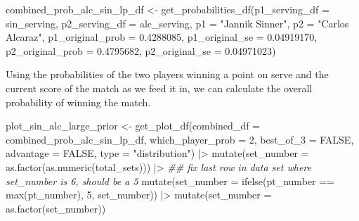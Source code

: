 \documentclass[
  letterpaper,
  DIV=11,
  numbers=noendperiod]{scrartcl}
\newenvironment{Shaded}{\begin{snugshade}}{\end{snugshade}}
\newcommand{\AttributeTok}[1]{\textcolor[rgb]{0.40,0.45,0.13}{#1}}
\newcommand{\ConstantTok}[1]{\textcolor[rgb]{0.56,0.35,0.01}{#1}}
\newcommand{\DecValTok}[1]{\textcolor[rgb]{0.68,0.00,0.00}{#1}}
\newcommand{\DocumentationTok}[1]{\textcolor[rgb]{0.37,0.37,0.37}{\textit{#1}}}
\newcommand{\FloatTok}[1]{\textcolor[rgb]{0.68,0.00,0.00}{#1}}
\newcommand{\FunctionTok}[1]{\textcolor[rgb]{0.28,0.35,0.67}{#1}}
\newcommand{\NormalTok}[1]{\textcolor[rgb]{0.00,0.23,0.31}{#1}}
\newcommand{\OtherTok}[1]{\textcolor[rgb]{0.00,0.23,0.31}{#1}}
\newcommand{\SpecialCharTok}[1]{\textcolor[rgb]{0.37,0.37,0.37}{#1}}
\newcommand{\StringTok}[1]{\textcolor[rgb]{0.13,0.47,0.30}{#1}}
\begin{document}
\linespread{0.9}

\begin{Shaded}
\begin{Highlighting}[]
\NormalTok{combined\_prob\_alc\_sin\_lp\_df }\OtherTok{\textless{}{-}} \FunctionTok{get\_probabilities\_df}\NormalTok{(}\AttributeTok{p1\_serving\_df =}\NormalTok{ sin\_serving,}
                                 \AttributeTok{p2\_serving\_df =}\NormalTok{ alc\_serving,}
                                 \AttributeTok{p1 =} \StringTok{"Jannik Sinner"}\NormalTok{,}
                                 \AttributeTok{p2 =} \StringTok{"Carlos Alcaraz"}\NormalTok{,}
                                 \AttributeTok{p1\_original\_prob =} \FloatTok{0.4288085}\NormalTok{,}
                                 \AttributeTok{p1\_original\_se =} \FloatTok{0.04919170}\NormalTok{,}
                                 \AttributeTok{p2\_original\_prob =} \FloatTok{0.4795682}\NormalTok{,}
                                 \AttributeTok{p2\_original\_se =} \FloatTok{0.04971023}\NormalTok{)}
\end{Highlighting}
\end{Shaded}

\linespread{2}

Using the probabilities of the two players winning a point on serve and
the current score of the match as we feed it in, we can calculate the
overall probability of winning the match.

\linespread{0.9}

\begin{Shaded}
\begin{Highlighting}[]
\NormalTok{plot\_sin\_alc\_large\_prior }\OtherTok{\textless{}{-}} \FunctionTok{get\_plot\_df}\NormalTok{(}\AttributeTok{combined\_df =}\NormalTok{ combined\_prob\_alc\_sin\_lp\_df,}
                                        \AttributeTok{which\_player\_prob =} \DecValTok{2}\NormalTok{,}
                                        \AttributeTok{best\_of\_3 =} \ConstantTok{FALSE}\NormalTok{,}
                                        \AttributeTok{advantage =} \ConstantTok{FALSE}\NormalTok{,}
                                        \AttributeTok{type =} \StringTok{"distribution"}\NormalTok{) }\SpecialCharTok{|\textgreater{}}
  \FunctionTok{mutate}\NormalTok{(}\AttributeTok{set\_number =} \FunctionTok{as.factor}\NormalTok{(}\FunctionTok{as.numeric}\NormalTok{(total\_sets))) }\SpecialCharTok{|\textgreater{}}
  \DocumentationTok{\#\# fix last row in data set where set\_number is 6, should be a 5}
  \FunctionTok{mutate}\NormalTok{(}\AttributeTok{set\_number =} \FunctionTok{ifelse}\NormalTok{(pt\_number }\SpecialCharTok{==} \FunctionTok{max}\NormalTok{(pt\_number), }\StringTok{\textquotesingle{}5\textquotesingle{}}\NormalTok{, set\_number)) }\SpecialCharTok{|\textgreater{}}
  \FunctionTok{mutate}\NormalTok{(}\AttributeTok{set\_number =} \FunctionTok{as.factor}\NormalTok{(set\_number))}
\end{Highlighting}
\end{Shaded}
\end{document}
